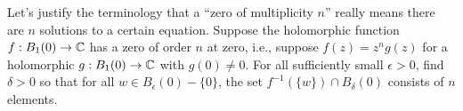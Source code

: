\documentclass{homework}
\begin{document}
                                                                                                  \begin{problem}
                                                                                                    Let's justify the terminology that a ``zero of multiplicity $n$''
                                                                                                      really means there are $n$ solutions to a certain equation.  Suppose
                                                                                                        the holomorphic function $f : B_1(0) \to \mathbb{C}$ has a zero of order $n$
                                                                                                          at zero, i.e., suppose $f(z) = z^n g(z)$ for a holomorphic
                                                                                                            $g : B_1(0) \to \mathbb{C}$ with $g(0) \neq 0$.  For all sufficiently small
                                                                                                              $\epsilon > 0$, find $\delta > 0$ so that for all
                                                                                                                $w \in B_\epsilon(0) - \{0\}$, the set
                                                                                                                  $f^{-1}(\{w\}) \cap B_\delta(0)$ consists of $n$ elements.
                                                                                                                  \end{problem}
\end{document}
